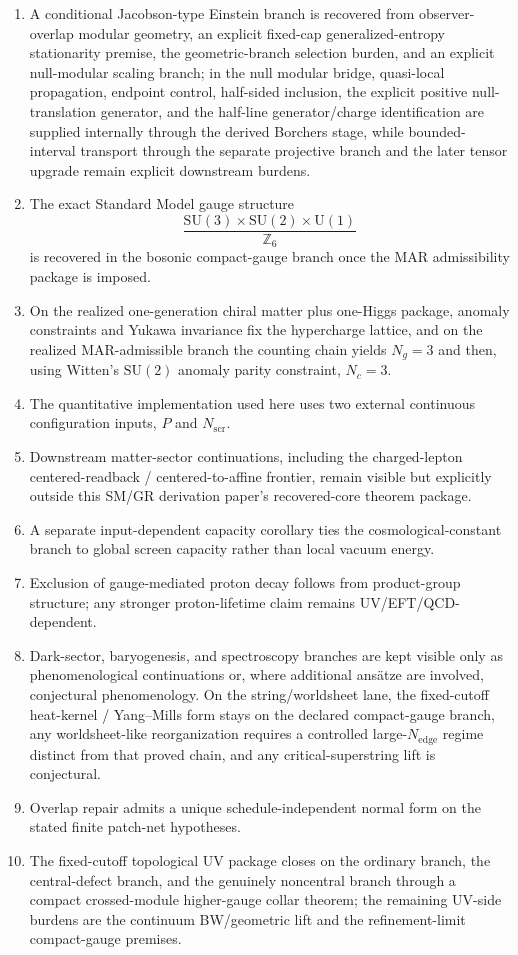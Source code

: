 \documentclass[11pt]{article}
\newcommand{\SU}{\mathrm{SU}}
\newcommand{\U}{\mathrm{U}}
\begin{document}
\begin{enumerate}[leftmargin=2em]
\item A conditional Jacobson-type Einstein branch is recovered from observer-overlap modular geometry, an explicit fixed-cap generalized-entropy stationarity premise, the geometric-branch selection burden, and an explicit null-modular scaling branch; in the null modular bridge, quasi-local propagation, endpoint control, half-sided inclusion, the explicit positive null-translation generator, and the half-line generator/charge identification are supplied internally through the derived Borchers stage, while bounded-interval transport through the separate projective branch and the later tensor upgrade remain explicit downstream burdens.
\item The exact Standard Model gauge structure
\[
\frac{\SU(3)\times\SU(2)\times\U(1)}{\mathbb Z_6}
\]
is recovered in the bosonic compact-gauge branch once the MAR admissibility package is imposed.
\item On the realized one-generation chiral matter plus one-Higgs package, anomaly constraints and Yukawa invariance fix the hypercharge lattice, and on the realized MAR-admissible branch the counting chain yields \(N_g=3\) and then, using Witten's \(\SU(2)\) anomaly parity constraint, \(N_c=3\).
\item The quantitative implementation used here uses two external continuous configuration inputs, $P$ and $N_{\mathrm{scr}}$.
\item Downstream matter-sector continuations, including the charged-lepton centered-readback / centered-to-affine frontier, remain visible but explicitly outside this SM/GR derivation paper's recovered-core theorem package.
\item A separate input-dependent capacity corollary ties the cosmological-constant branch to global screen capacity rather than local vacuum energy.
\item Exclusion of gauge-mediated proton decay follows from product-group structure; any stronger proton-lifetime claim remains UV/EFT/QCD-dependent.
\item Dark-sector, baryogenesis, and spectroscopy branches are kept visible only as phenomenological continuations or, where additional ans\"atze are involved, conjectural phenomenology. On the string/worldsheet lane, the fixed-cutoff heat-kernel / Yang--Mills form stays on the declared compact-gauge branch, any worldsheet-like reorganization requires a controlled large-\(N_{\mathrm{edge}}\) regime distinct from that proved chain, and any critical-superstring lift is conjectural.
\item Overlap repair admits a unique schedule-independent normal form on the stated finite patch-net hypotheses.
\item The fixed-cutoff topological UV package closes on the ordinary branch, the central-defect branch, and the genuinely noncentral branch through a compact crossed-module higher-gauge collar theorem; the remaining UV-side burdens are the continuum BW/geometric lift and the refinement-limit compact-gauge premises.
\end{enumerate}
\end{document}
